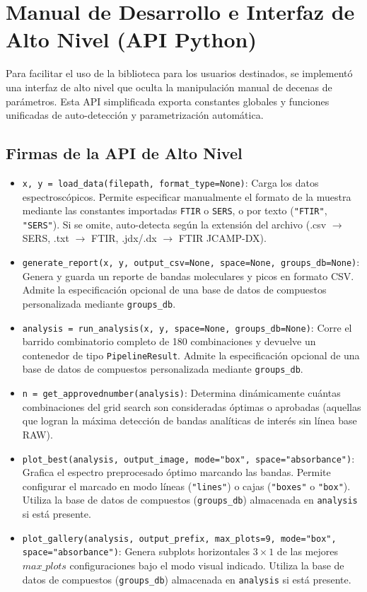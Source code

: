 \section{Manual de Desarrollo e Interfaz de Alto Nivel (API Python)}
Para facilitar el uso de la biblioteca para los usuarios destinados, se implementó una interfaz de alto nivel que oculta la manipulación manual de decenas de parámetros. Esta API simplificada exporta constantes globales y funciones unificadas de auto-detección y parametrización automática.

\subsection{Firmas de la API de Alto Nivel}
\begin{itemize}
    \item \texttt{x, y = load\_data(filepath, format\_type=None)}: Carga los datos espectroscópicos. Permite especificar manualmente el formato de la muestra mediante las constantes importadas \texttt{FTIR} o \texttt{SERS}, o por texto (\texttt{"FTIR"}, \texttt{"SERS"}). Si se omite, auto-detecta según la extensión del archivo (.csv $\rightarrow$ SERS, .txt $\rightarrow$ FTIR, .jdx/.dx $\rightarrow$ FTIR JCAMP-DX).
    \item \texttt{generate\_report(x, y, output\_csv=None, space=None, groups\_db=None)}: Genera y guarda un reporte de bandas moleculares y picos en formato CSV. Admite la especificación opcional de una base de datos de compuestos personalizada mediante \texttt{groups\_db}.
    \item \texttt{analysis = run\_analysis(x, y, space=None, groups\_db=None)}: Corre el barrido combinatorio completo de 180 combinaciones y devuelve un contenedor de tipo \texttt{PipelineResult}. Admite la especificación opcional de una base de datos de compuestos personalizada mediante \texttt{groups\_db}.
    \item \texttt{n = get\_approvednumber(analysis)}: Determina dinámicamente cuántas combinaciones del grid search son consideradas óptimas o aprobadas (aquellas que logran la máxima detección de bandas analíticas de interés sin línea base RAW).
    \item \texttt{plot\_best(analysis, output\_image, mode="box", space="absorbance")}: Grafica el espectro preprocesado óptimo marcando las bandas. Permite configurar el marcado en modo líneas (\texttt{"lines"}) o cajas (\texttt{"boxes"} o \texttt{"box"}). Utiliza la base de datos de compuestos (\texttt{groups\_db}) almacenada en \texttt{analysis} si está presente.
    \item \texttt{plot\_gallery(analysis, output\_prefix, max\_plots=9, mode="box", space="absorbance")}: Genera subplots horizontales $3 \times 1$ de las mejores $max\_plots$ configuraciones bajo el modo visual indicado. Utiliza la base de datos de compuestos (\texttt{groups\_db}) almacenada en \texttt{analysis} si está presente.
\end{itemize}

